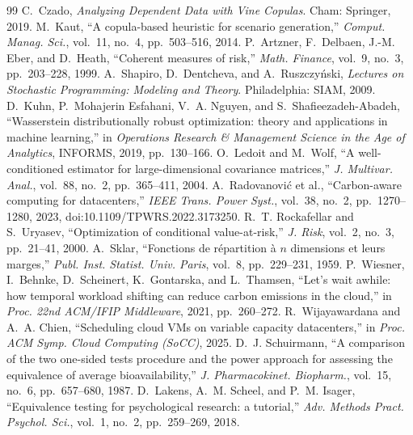 \documentclass[12pt]{article}
\begin{document}
\begin{thebibliography}{99}
 C.~Czado, \emph{Analyzing Dependent Data with Vine Copulas}.
Cham: Springer, 2019.
 M.~Kaut, ``A copula-based heuristic for scenario generation,''
\emph{Comput. Manag. Sci.}, vol.~11, no.~4, pp.~503--516, 2014.
 P.~Artzner, F.~Delbaen, J.-M. Eber, and D.~Heath, ``Coherent
measures of risk,'' \emph{Math. Finance}, vol.~9, no.~3, pp.~203--228, 1999.
 A.~Shapiro, D.~Dentcheva, and A.~Ruszczy\'nski, \emph{Lectures
on Stochastic Programming: Modeling and Theory}. Philadelphia: SIAM, 2009.
 D.~Kuhn, P.~Mohajerin Esfahani, V.~A. Nguyen, and
S.~Shafieezadeh-Abadeh, ``Wasserstein distributionally robust optimization: theory
and applications in machine learning,'' in \emph{Operations Research \& Management
Science in the Age of Analytics}, INFORMS, 2019, pp.~130--166.
 O.~Ledoit and M.~Wolf, ``A well-conditioned estimator for
large-dimensional covariance matrices,'' \emph{J. Multivar. Anal.}, vol.~88,
no.~2, pp.~365--411, 2004.
 A.~Radovanovi\'c et al., ``Carbon-aware computing for
datacenters,'' \emph{IEEE Trans. Power Syst.}, vol.~38, no.~2, pp.~1270--1280,
2023, doi:10.1109/TPWRS.2022.3173250.
 R.~T. Rockafellar and S.~Uryasev, ``Optimization of
conditional value-at-risk,'' \emph{J. Risk}, vol.~2, no.~3, pp.~21--41, 2000.
 A.~Sklar, ``Fonctions de r\'epartition \`a $n$ dimensions et
leurs marges,'' \emph{Publ. Inst. Statist. Univ. Paris}, vol.~8, pp.~229--231,
1959.
 P.~Wiesner, I.~Behnke, D.~Scheinert, K.~Gontarska, and
L.~Thamsen, ``Let's wait awhile: how temporal workload shifting can reduce carbon
emissions in the cloud,'' in \emph{Proc. 22nd ACM/IFIP Middleware}, 2021,
pp.~260--272.
 R.~Wijayawardana and A.~A. Chien, ``Scheduling cloud
VMs on variable capacity datacenters,'' in \emph{Proc. ACM Symp. Cloud Computing
(SoCC)}, 2025.
 D.~J. Schuirmann, ``A comparison of the two one-sided tests
procedure and the power approach for assessing the equivalence of average
bioavailability,'' \emph{J. Pharmacokinet. Biopharm.}, vol.~15, no.~6,
pp.~657--680, 1987.
 D.~Lakens, A.~M. Scheel, and P.~M. Isager, ``Equivalence
testing for psychological research: a tutorial,'' \emph{Adv. Methods Pract. Psychol.
Sci.}, vol.~1, no.~2, pp.~259--269, 2018.
\end{thebibliography}

\appendix
\end{document}
